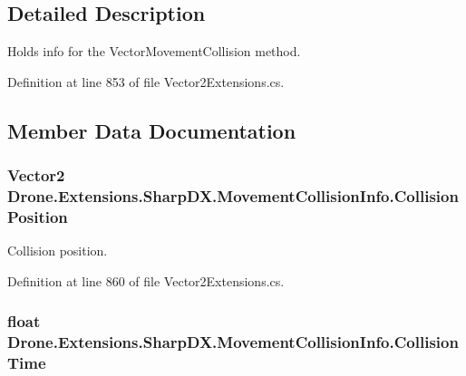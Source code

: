 \subsection{Detailed Description}
Holds info for the Vector\+Movement\+Collision method. 



Definition at line 853 of file Vector2\+Extensions.\+cs.



\subsection{Member Data Documentation}
\hypertarget{struct_drone_1_1_extensions_1_1_sharp_d_x_1_1_movement_collision_info_a0d281f28c9b8bdfe6f7965a1d3a61508}{}
\subsubsection[{Collision\+Position}]{\setlength{\rightskip}{0pt plus 5cm}Vector2 Drone.\+Extensions.\+Sharp\+D\+X.\+Movement\+Collision\+Info.\+Collision\+Position}\label{struct_drone_1_1_extensions_1_1_sharp_d_x_1_1_movement_collision_info_a0d281f28c9b8bdfe6f7965a1d3a61508}


Collision position. 



Definition at line 860 of file Vector2\+Extensions.\+cs.

\hypertarget{struct_drone_1_1_extensions_1_1_sharp_d_x_1_1_movement_collision_info_a5da0c6cf95e3f8730e0d996e58befa14}{}
\subsubsection[{Collision\+Time}]{\setlength{\rightskip}{0pt plus 5cm}float Drone.\+Extensions.\+Sharp\+D\+X.\+Movement\+Collision\+Info.\+Collision\+Time}\label{struct_drone_1_1_extensions_1_1_sharp_d_x_1_1_movement_collision_info_a5da0c6cf95e3f8730e0d996e58befa14}


